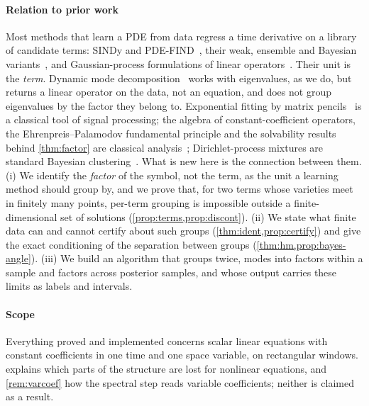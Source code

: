\documentclass[11pt]{article}
\theoremstyle{plain}
\theoremstyle{definition}
\theoremstyle{remark}
\begin{document}
\paragraph{Relation to prior work}
Most methods that learn a PDE from data regress a time derivative on a library of candidate terms: SINDy and
PDE-FIND~\cite{BruProKut16,RudBruProKut17}, their weak, ensemble and Bayesian variants~\cite{MesBor21,FasKutBru22,HirBarKut22},
and Gaussian-process formulations of linear operators~\cite{RaiPerKar17}. Their unit is the \emph{term}. Dynamic mode
decomposition~\cite{Sch10,SasKut22} works with eigenvalues, as we do, but returns a linear operator on the data, not an
equation, and does not group eigenvalues by the factor they belong to. Exponential fitting by matrix
pencils~\cite{HuaSar90} is a classical tool of signal processing; the algebra of constant-coefficient operators, the
Ehrenpreis--Palamodov fundamental principle and the solvability results behind \cref{thm:factor} are classical
analysis~\cite{Ehr70,Pal70,Mal56,Hor90,Obe90}; Dirichlet-process mixtures are standard Bayesian
clustering~\cite{BleJor06}. What is new here is the connection between them. (i) We identify the \emph{factor} of the
symbol, not the term, as the unit a learning method should group by, and we prove that, for two terms whose varieties meet in finitely many points, per-term grouping is impossible
outside a finite-dimensional set of solutions (\cref{prop:terms,prop:discont}). (ii) We state what finite data can and
cannot certify about such groups (\cref{thm:ident,prop:certify}) and give the exact conditioning of the
separation between groups (\cref{thm:hm,prop:bayes-angle}). (iii) We build an algorithm that groups twice, modes into
factors within a sample and factors across posterior samples, and whose output carries these limits as labels and
intervals.



\paragraph{Scope} Everything proved and implemented concerns scalar linear equations with constant coefficients in one
time and one space variable, on rectangular windows.  explains which parts of the structure are lost
for nonlinear equations, and \cref{rem:varcoef} how the spectral step reads variable coefficients; neither is claimed as a
result.
\end{document}
